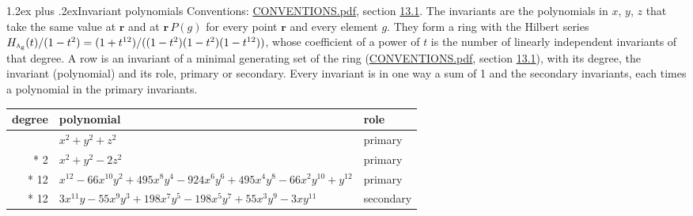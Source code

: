 \documentclass[10pt,a4paper]{article}
\makeatletter
\renewcommand\section{\@startsection{section}{1}{\z@}{-3ex plus -1ex minus -.2ex}%
  {1.2ex plus .2ex}{\normalfont\large\sffamily\bfseries\color{parttitle}}}
\numberwithin{equation}{section}
\newcommand{\irr}[1]{\text{\normalfont\scshape #1}}
\newcommand{\ptag}[1]{\mathrm{#1}}
\newcommand{\pointr}{\mathbf{r}}
\makeatother
\begin{document}
\section{Invariant polynomials}\label{s:invariant_polynomials}
Conventions: \href{../../CONVENTIONS.pdf}{CONVENTIONS.pdf}, section \href{../../CONVENTIONS.pdf\#conv.13.1}{13.1}.
The invariants are the polynomials in $x$, $y$, $z$ that take the same value at $\pointr$ and at $\pointr\,P(g)$ for every point $\pointr$ and every element $g$. They form a ring with the Hilbert series $H_{\irr{a}_{\ptag{g}}}(t)/(1-t^{2}) = (1 + t^{12})/((1-t^{2})(1-t^{2})(1-t^{12}))$, whose coefficient of a power of $t$ is the number of linearly independent invariants of that degree. \label{n:head.degree}\label{n:head.role}A row is an invariant of a minimal generating set of the ring (\href{../../CONVENTIONS.pdf}{CONVENTIONS.pdf}, section \href{../../CONVENTIONS.pdf\#conv.13.1}{13.1}), with its degree, the invariant (polynomial) and its role, primary or secondary. Every invariant is in one way a sum of 1 and the secondary invariants, each times a polynomial in the primary invariants.
{\small\begin{longtable}{@{}rll@{}}\toprule
degree & polynomial & role\\\midrule\endhead
\bottomrule\endfoot\endlastfoot
2 & $x^{2} + y^{2} + z^{2}$ & primary\\*
2 & $x^{2} + y^{2} - 2z^{2}$ & primary\\*
12 & $x^{12} - 66x^{10}y^{2} + 495x^{8}y^{4} - 924x^{6}y^{6} + 495x^{4}y^{8} - 66x^{2}y^{10} + y^{12}$ & primary\\*
12 & $3x^{11}y - 55x^{9}y^{3} + 198x^{7}y^{5} - 198x^{5}y^{7} + 55x^{3}y^{9} - 3xy^{11}$ & secondary\\
\bottomrule\end{longtable}}
\end{document}
